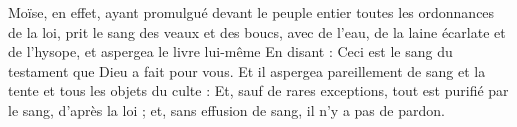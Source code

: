 Moïse, en effet, ayant promulgué devant le peuple entier toutes les ordonnances de la loi, prit le sang des veaux et des boucs, avec de l'eau, de la laine écarlate et de l'hysope, et aspergea le livre lui-même 
En disant : Ceci est le sang du testament que Dieu a fait pour vous.
Et il aspergea pareillement de sang et la tente et tous les objets du culte :
Et, sauf de rares exceptions, tout est purifié par le sang, d'après la loi ; et, sans effusion de sang, il n'y a pas de pardon.
